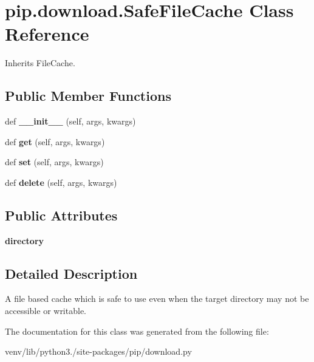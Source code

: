 \hypertarget{classpip_1_1download_1_1_safe_file_cache}{}\section{pip.\+download.\+Safe\+File\+Cache Class Reference}
\label{classpip_1_1download_1_1_safe_file_cache}


Inherits File\+Cache.

\subsection*{Public Member Functions}
\begin{DoxyCompactItemize}
\item 
\mbox{\label{classpip_1_1download_1_1_safe_file_cache_ae2bf214b319ef52e2a5729450b2b4151}} 
def {\bfseries \+\_\+\+\_\+init\+\_\+\+\_\+} (self, args, kwargs)
\item 
\mbox{\label{classpip_1_1download_1_1_safe_file_cache_aad969b936dfe3eeab3659dfc78324fd8}} 
def {\bfseries get} (self, args, kwargs)
\item 
\mbox{\label{classpip_1_1download_1_1_safe_file_cache_a1b0dccf64a5b42bf533321e371944ed5}} 
def {\bfseries set} (self, args, kwargs)
\item 
\mbox{\label{classpip_1_1download_1_1_safe_file_cache_ac69242e0ac49b7fd16e46e7e2a44b642}} 
def {\bfseries delete} (self, args, kwargs)
\end{DoxyCompactItemize}
\subsection*{Public Attributes}
\begin{DoxyCompactItemize}
\item 
\mbox{\label{classpip_1_1download_1_1_safe_file_cache_aa30bcb3f068d7c589d7229ddd7826a2c}} 
{\bfseries directory}
\end{DoxyCompactItemize}


\subsection{Detailed Description}
\begin{DoxyVerb}A file based cache which is safe to use even when the target directory may
not be accessible or writable.
\end{DoxyVerb}
 

The documentation for this class was generated from the following file\+:\begin{DoxyCompactItemize}
\item 
venv/lib/python3./site-\/packages/pip/download.\+py\end{DoxyCompactItemize}
